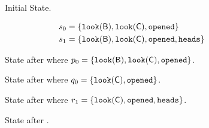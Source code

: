 \documentclass[12pt, a4paper]{article}
\begin{document}
\begin{figure}[H]
	\centering
	
	\caption{Initial State.}
\end{figure}%
\begin{align*}
s_0 &= \bra{\looking b,\looking c, \opened}\\
s_1 &= \bra{\looking{b},\looking{c},\opened,\head}
\end{align*}

\begin{figure}[H]
	\centering
	
	\caption{State after  where $p_0 = \bra{\looking b,\looking c, \opened}$.}
\end{figure}%


\begin{figure}[H]
	\centering
	
	\caption{State after  where $q_0 = \bra{\looking c, \opened}$.}
\end{figure}%


\begin{figure}[H]
	\centering
	
	\caption{State after  where $r_1 = \bra{\looking c, \opened, \head}$.}
\end{figure}%


\begin{figure}[H]
	\centering
	
	\caption{State after .}
\end{figure}%
\end{document}
